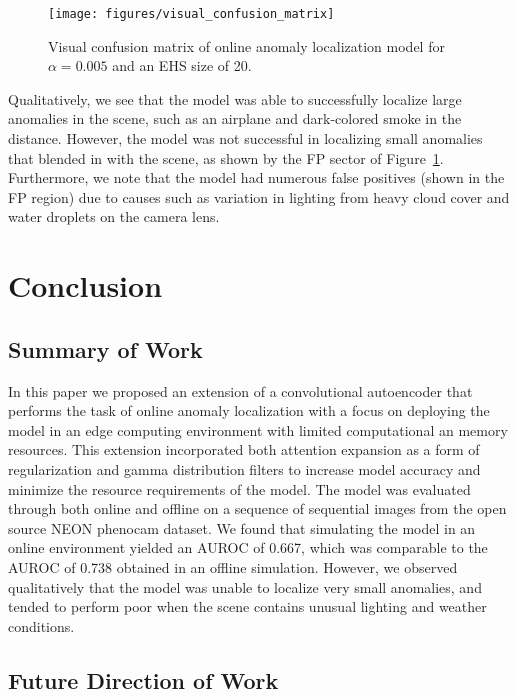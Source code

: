 \documentclass[12pt]{article}
\begin{document}
\begin{figure}[H]
\begin{center}
\texttt{[image: figures/visual\_confusion\_matrix]}
\end{center}
\caption{Visual confusion matrix of online anomaly localization model for $\alpha = 0.005$ and an EHS size of 20.}
\label{fig:visual_confusion_matrix}
\end{figure}

Qualitatively, we see that the model was able to successfully localize large anomalies in the scene, such as an airplane and dark-colored smoke in the distance. However, the model was not successful in localizing small anomalies that blended in with the scene, as shown by the FP sector of Figure~\ref{fig:visual_confusion_matrix}. Furthermore, we note that the model had numerous false positives (shown in the FP region) due to causes such as variation in lighting from heavy cloud cover and water droplets on the camera lens.

\section{Conclusion}
\subsection{Summary of Work}

In this paper we proposed an extension of a convolutional autoencoder that performs the task of online anomaly localization with a focus on deploying the model in an edge computing environment with limited computational an memory resources. This extension incorporated both attention expansion \cite{attention_anomalies,grad_cam} as a form of regularization and gamma distribution filters to increase model accuracy and minimize the resource requirements of the model. The model was evaluated through both online and offline on a sequence of sequential images from the open source NEON phenocam dataset. We found that simulating the model in an online environment yielded an AUROC of 0.667, which was comparable to the AUROC of 0.738 obtained in an offline simulation. However, we observed qualitatively that the model was unable to localize very small anomalies, and tended to perform poor when the scene contains unusual lighting and weather conditions.

\subsection{Future Direction of Work}
\end{document}
